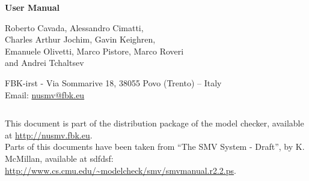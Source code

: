 \begin{titlepage}
\begin{center}
  \begin{Huge}
  \textbf{\NuSMV User Manual}\\
  \end{Huge}
  \vspace{0.5cm}
  \vspace{4.0cm}

  \begin{Large}
    \begin{bf}
      Roberto Cavada, Alessandro Cimatti,\\ 
      Charles Arthur Jochim, Gavin Keighren,\\
      Emanuele Olivetti, Marco Pistore, Marco Roveri\\
      and Andrei Tchaltsev
    \end{bf}
  \end{Large}

  \vspace{1cm}
  {FBK-irst - Via Sommarive 18, 38055 Povo (Trento) -- Italy}\\

  \vspace{1cm}
  Email: \url{nusmv@fbk.eu}\\
  \vspace{4.0cm}
\end{center}
\vspace{1in}
\end{titlepage}



\newpage
\thispagestyle{empty}
$~~~~~~~~~~~~~~~~~~~~~~~~~~~~~~~~~~$\\
\vspace{15cm}

\noindent This document is part of the distribution package of the
\nusmv model checker, available at \url{http://nusmv.fbk.eu}. \\


\noindent
Parts of this documents have been taken from ``The SMV System - Draft'', by
K. McMillan, available at sdfdsf: 
\url{http://www.cs.cmu.edu/\~modelcheck/smv/smvmanual.r2.2.ps}.\\

\noindent
\copymsg


